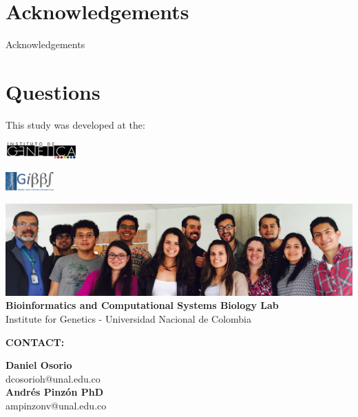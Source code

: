 \documentclass[11pt]{beamer}
\begin{document}
\section{Acknowledgements}
\begin{frame}{Acknowledgements}

\end{frame}
\section{Questions}
\begin{frame}{This study was developed at the:}
\begin{multicols}{2}
\includegraphics[height=0.7cm]{logoIG}
\begin{flushright}
\includegraphics[height=0.7cm]{logoGIBBS}
\end{flushright}
\end{multicols}
\begin{center}
\includegraphics[width=\textwidth]{GIBBS}\\
\textbf{Bioinformatics and Computational Systems Biology Lab}\\
Institute for Genetics - Universidad Nacional de Colombia
\end{center}
\begin{center}
\textbf{CONTACT:}
\begin{multicols}{2}
\begin{center}
\textbf{Daniel Osorio}\\
dcosorioh@unal.edu.co\\
\textbf{Andrés Pinzón PhD}\\
ampinzonv@unal.edu.co
\end{center}
\end{multicols}
\end{center}
\end{frame}
\end{document}
